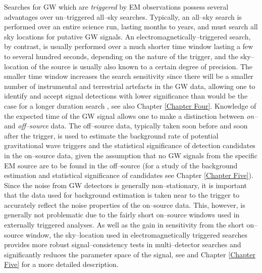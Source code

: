 Searches for \ac{GW} which are \emph{triggered} by \ac{EM} observations possess several advantages over un--triggered all--sky searches. Typically, an all--sky search is performed over an entire science run, lasting months to years, and must search all sky locations for putative \ac{GW} signals. An electromagnetically--triggered search, by contrast, is usually performed over a much shorter time window lasting a few to several hundred seconds, depending on the nature of the trigger, and the sky--location of the source is usually also known to a certain degree of precision. The smaller time window increases the search sensitivity since there will be a smaller number of instrumental and terrestrial artefacts in the GW data, allowing one to identify and accept signal detections with lower significance than would be the case for a longer duration search \cite{Harry:2010fr}, see also Chapter \ref{Chapter Four}.  Knowledge of the expected time of the \ac{GW} signal allows one to make a distinction between \emph{on--} and \emph{off--source} data.  The off--source data, typically taken soon before and soon after the trigger, is used to estimate the background rate of potential gravitational wave triggers and the statistical significance of detection candidates in the on--source data, given the assumption that no GW signals from the specific EM source are to be found in the off--source (for a study of the background estimation and statistical significance of candidates see Chapter \ref{Chapter Five}). Since the noise from \ac{GW} detectors is generally non--stationary, it is important that the data used for background estimation is taken near to the trigger to accurately reflect the noise properties of the on--source data. This, however, is generally not problematic due to the fairly short on--source windows used in externally triggered analyses.  As well as the gain in sensitivity from the short on--source window, the sky--location used in electromagnetically triggered searches provides more robust signal--consistency tests in multi--detector searches and significantly reduces the parameter space of the signal, see \cite{Harry:2010fr} and Chapter \ref{Chapter Five} for a more detailed description.

